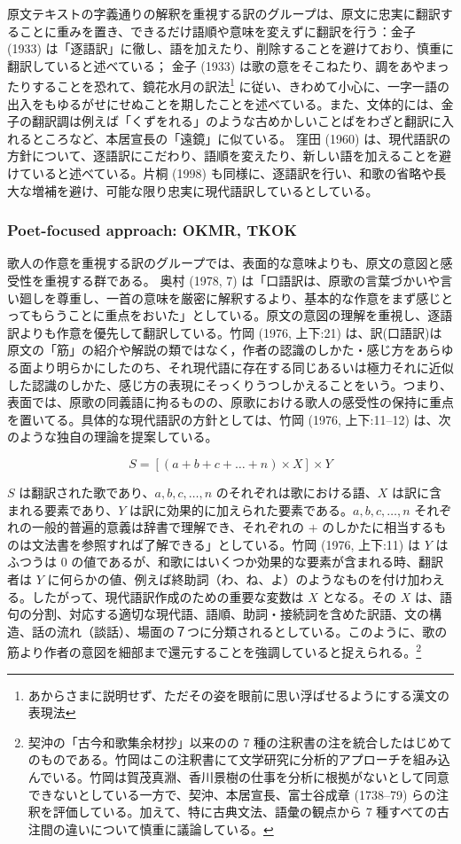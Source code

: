 \documentclass[
  letterpaper,
  DIV=11,
  numbers=noendperiod]{scrartcl}
\begin{document}
原文テキストの字義通りの解釈を重視する訳のグループは、原文に忠実に翻訳することに重みを置き、できるだけ語順や意味を変えずに翻訳を行う：金子
(1933)
は「逐語訳」に徹し、語を加えたり、削除することを避けており、慎重に翻訳していると述べている；
金子 (1933)
は歌の意をそこねたり、調をあやまったりすることを恐れて、鏡花水月の訳法\footnote{あからさまに説明せず、ただその姿を眼前に思い浮ばせるようにする漢文の表現法}
に従い、きわめて小心に、一字一語の出入をもゆるがせにせぬことを期したことを述べている。また、文体的には、金子の翻訳調は例えば「くずをれる」のような古めかしいことばをわざと翻訳に入れるところなど、本居宣長の「遠鏡」に似ている。
窪田 (1960)
は、現代語訳の方針について、逐語訳にこだわり、語順を変えたり、新しい語を加えることを避けていると述べている。片桐
(1998)
も同様に、逐語訳を行い、和歌の省略や長大な増補を避け、可能な限り忠実に現代語訳しているとしている。

\subsubsection*{Poet-focused approach: OKMR,
TKOK}\label{poet-focused-approach-okmr-tkok}

歌人の作意を重視する訳のグループでは、表面的な意味よりも、原文の意図と感受性を重視する群である。
奥村 (1978, 7)
は「口語訳は、原歌の言葉づかいや言い廻しを尊重し、一首の意味を厳密に解釈するより、基本的な作意をまず感じとってもらうことに重点をおいた」としている。原文の意図の理解を重視し、逐語訳よりも作意を優先して翻訳している。竹岡
(1976, 上下:21)
は、訳(口語訳)は原文の「筋」の紹介や解説の類ではなく，作者の認識のしかた・感じ方をあらゆる面より明らかにしたのち、それ現代語に存在する同じあるいは極力それに近似した認識のしかた、感じ方の表現にそっくりうつしかえることをいう。つまり、表面では、原歌の同義語に拘るものの、原歌における歌人の感受性の保持に重点を置いてる。具体的な現代語訳の方針としては、竹岡
(1976, 上下:11--12) は、次のような独自の理論を提案している。

\[
S=\left[\left(a+b+c+\dots+n\right)\times X \right]\times Y
\]

\(S\) は翻訳された歌であり、\(a, b, c, \dots, n\)
のそれぞれは歌における語、\(X\) は訳に含まれる要素であり、\(Y\)
は訳に効果的に加えられた要素である。\(a,b,c, \dots, n\)
それぞれの一般的普遍的意義は辞書で理解でき、それぞれの \(+\)
のしかたに相当するものは文法書を参照すれば了解できる」としている。竹岡
(1976, 上下:11) は \(Y\) はふつうは 0
の値であるが、和歌にはいくつか効果的な要素が含まれる時、翻訳者は \(Y\)
に何らかの値、例えば終助詞（わ、ね、よ）のようなものを付け加わえる。したがって、現代語訳作成のための重要な変数は
\(X\) となる。その \(X\)
は、語句の分割、対応する適切な現代語、語順、助詞・接続詞を含めた訳語、文の構造、話の流れ（談話）、場面の７つに分類されるとしている。このように、歌の筋より作者の意図を細部まで還元することを強調していると捉えられる。\footnote{契沖の「古今和歌集余材抄」以来のの
  7
  種の注釈書の注を統合したはじめてのものである。竹岡はこの注釈書にて文学研究に分析的アプローチを組み込んでいる。竹岡は賀茂真淵、香川景樹の仕事を分析に根拠がないとして同意できないとしている一方で、契沖、本居宣長、富士谷成章
  (1738--79)
  らの注釈を評価している。加えて、特に古典文法、語彙の観点から 7
  種すべての古注間の違いについて慎重に議論している。}
\end{document}
